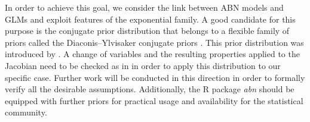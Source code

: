 \documentclass{svproc}
\def\ds{\displaystyle}
\newcommand{\bbeta}{{\bm{\beta}}}
\newcommand{\btheta}{{\bm{\theta}}}
\newcommand{\X}{{\textbf{\textit{X}}}}
\newcommand{\Abn}{{\mathcal{A}}}
\newcommand{\Bay}{{\mathcal{B}}}
\newcommand{\Mod}{{\mathcal{M}}}
\newcommand{\Str}{{\mathcal{S}}}
\begin{document}
In order to achieve this goal, we consider the link between ABN models and GLMs and exploit features of the exponential family.
A good candidate for this purpose is the conjugate prior distribution that belongs to a flexible family of priors called the Diaconis--Ylvisaker conjugate priors \cite{Diaconis1979}. This prior distribution was introduced by \cite{Chen2003}. A change of variables and the resulting properties applied to the Jacobian need to be checked as in \cite{Gut1995} in order to apply this distribution to our specific case.
Further work will be conducted in this direction in order to formally verify all the desirable assumptions. Additionally,  the R package \emph{abn} \cite{Kratzer} should be equipped with further priors for practical usage and  availability  for the statistical community.

%
%
%
\end{document}
